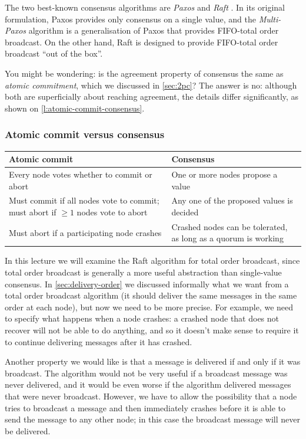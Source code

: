 The two best-known consensus algorithms are \emph{Paxos} \citep{Lamport:1998} and \emph{Raft} \citep{Ongaro:2014}.
In its original formulation, Paxos provides only consensus on a single value, and the \emph{Multi-Paxos} algorithm is a generalisation of Paxos that provides FIFO-total order broadcast.
On the other hand, Raft is designed to provide FIFO-total order broadcast ``out of the box''.

You might be wondering: is the agreement property of consensus the same as \emph{atomic commitment}, which we discussed in \autoref{sec:2pc}?
The answer is no: although both are superficially about reaching agreement, the details differ significantly, as shown on \autoref{l:atomic-commit-consensus}.

\begin{frame}
    \label{s:atomic-commit-consensus}
    \frametitle{Atomic commit versus consensus}
    \renewcommand{\arraystretch}{1.5}
    \begin{tabular}{>{\raggedright}p{5cm}|>{\raggedright\arraybackslash}p{5cm}} %
        \textbf{Atomic commit} & \textbf{Consensus} \\\hline
        Every node votes whether to commit or abort & One or more nodes propose a value \pause\\
        Must commit if all nodes vote to commit; must abort if $\ge 1$ nodes vote to abort & Any one of the proposed values is decided \pause\\
        Must abort if a participating node crashes & Crashed nodes can be tolerated, as long as a quorum is working
    \end{tabular}
\end{frame}
\label{l:atomic-commit-consensus}

In this lecture we will examine the Raft algorithm for total order broadcast, since total order broadcast is generally a more useful abstraction than single-value consensus.
In \autoref{sec:delivery-order} we discussed informally what we want from a total order broadcast algorithm (it should deliver the same messages in the same order at each node), but now we need to be more precise.
For example, we need to specify what happens when a node crashes: a crashed node that does not recover will not be able to do anything, and so it doesn't make sense to require it to continue delivering messages after it has crashed.

Another property we would like is that a message is delivered if and only if it was broadcast.
The algorithm would not be very useful if a broadcast message was never delivered, and it would be even worse if the algorithm delivered messages that were never broadcast.
However, we have to allow the possibility that a node tries to broadcast a message and then immediately crashes before it is able to send the message to any other node; in this case the broadcast message will never be delivered.

